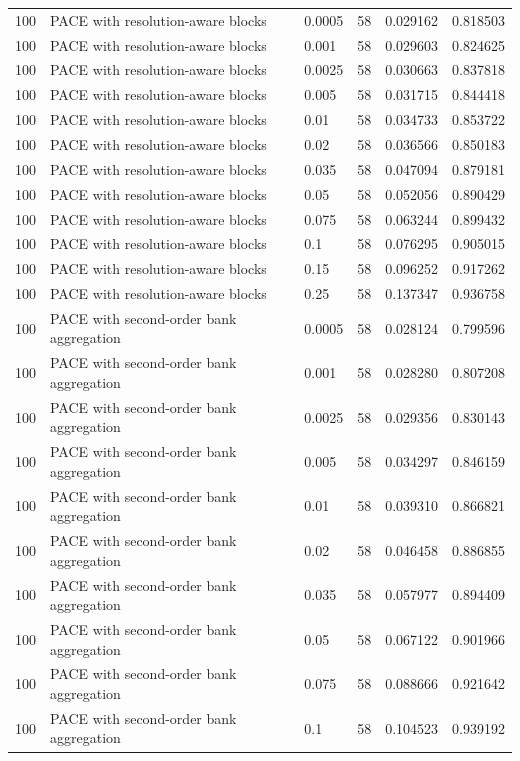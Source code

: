 \begin{tabular}{llllll}
100 & PACE with resolution-aware blocks & 0.0005 & 58 & 0.029162 & 0.818503 \\
100 & PACE with resolution-aware blocks & 0.001 & 58 & 0.029603 & 0.824625 \\
100 & PACE with resolution-aware blocks & 0.0025 & 58 & 0.030663 & 0.837818 \\
100 & PACE with resolution-aware blocks & 0.005 & 58 & 0.031715 & 0.844418 \\
100 & PACE with resolution-aware blocks & 0.01 & 58 & 0.034733 & 0.853722 \\
100 & PACE with resolution-aware blocks & 0.02 & 58 & 0.036566 & 0.850183 \\
100 & PACE with resolution-aware blocks & 0.035 & 58 & 0.047094 & 0.879181 \\
100 & PACE with resolution-aware blocks & 0.05 & 58 & 0.052056 & 0.890429 \\
100 & PACE with resolution-aware blocks & 0.075 & 58 & 0.063244 & 0.899432 \\
100 & PACE with resolution-aware blocks & 0.1 & 58 & 0.076295 & 0.905015 \\
100 & PACE with resolution-aware blocks & 0.15 & 58 & 0.096252 & 0.917262 \\
100 & PACE with resolution-aware blocks & 0.25 & 58 & 0.137347 & 0.936758 \\
100 & PACE with second-order bank aggregation & 0.0005 & 58 & 0.028124 & 0.799596 \\
100 & PACE with second-order bank aggregation & 0.001 & 58 & 0.028280 & 0.807208 \\
100 & PACE with second-order bank aggregation & 0.0025 & 58 & 0.029356 & 0.830143 \\
100 & PACE with second-order bank aggregation & 0.005 & 58 & 0.034297 & 0.846159 \\
100 & PACE with second-order bank aggregation & 0.01 & 58 & 0.039310 & 0.866821 \\
100 & PACE with second-order bank aggregation & 0.02 & 58 & 0.046458 & 0.886855 \\
100 & PACE with second-order bank aggregation & 0.035 & 58 & 0.057977 & 0.894409 \\
100 & PACE with second-order bank aggregation & 0.05 & 58 & 0.067122 & 0.901966 \\
100 & PACE with second-order bank aggregation & 0.075 & 58 & 0.088666 & 0.921642 \\
100 & PACE with second-order bank aggregation & 0.1 & 58 & 0.104523 & 0.939192 \\

\end{tabular}
